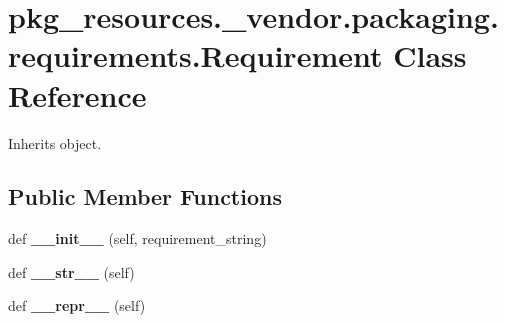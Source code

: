\hypertarget{classpkg__resources_1_1__vendor_1_1packaging_1_1requirements_1_1_requirement}{}\section{pkg\+\_\+resources.\+\_\+vendor.\+packaging.\+requirements.\+Requirement Class Reference}
\label{classpkg__resources_1_1__vendor_1_1packaging_1_1requirements_1_1_requirement}


Inherits object.

\subsection*{Public Member Functions}
\begin{DoxyCompactItemize}
\item 
\mbox{\label{classpkg__resources_1_1__vendor_1_1packaging_1_1requirements_1_1_requirement_a1e814c031e2a8e5890dcfb8632f411bd}} 
def {\bfseries \+\_\+\+\_\+init\+\_\+\+\_\+} (self, requirement\+\_\+string)
\item 
\mbox{\label{classpkg__resources_1_1__vendor_1_1packaging_1_1requirements_1_1_requirement_a59c0b571a8649df97b968342f51f89b4}} 
def {\bfseries \+\_\+\+\_\+str\+\_\+\+\_\+} (self)
\item 
\mbox{\label{classpkg__resources_1_1__vendor_1_1packaging_1_1requirements_1_1_requirement_ab697e34a438027b6c114095ab3dc9d99}} 
def {\bfseries \+\_\+\+\_\+repr\+\_\+\+\_\+} (self)
\end{DoxyCompactItemize}
